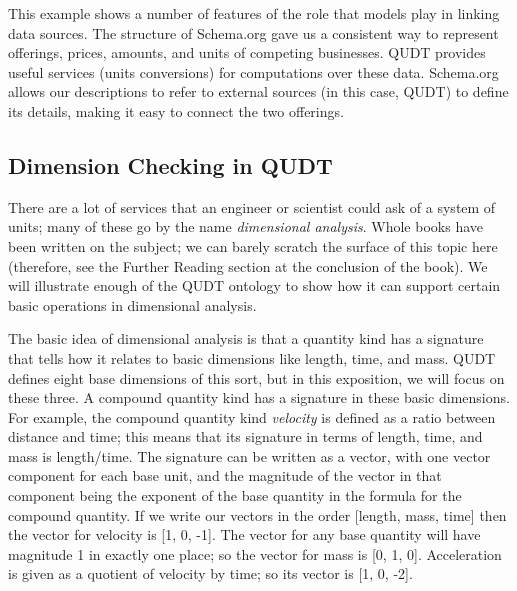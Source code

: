 This example shows a number of features of the role that models play in
linking data sources. The structure of Schema.org gave
us a consistent way to represent offerings, prices, amounts, and units
of competing businesses. QUDT provides useful services (units
conversions) for computations over these data. Schema.org allows our 
descriptions to refer to external sources (in this case, QUDT) to define
its details, making it easy to connect the two offerings. 

\subsection{Dimension Checking in QUDT}

There are a lot of services that an engineer or scientist could ask of a
system of units; many of these go by the name \emph{dimensional analysis}.
Whole books have been written on the subject; we can barely scratch the
surface of this topic here (therefore, see the Further Reading section
at the conclusion of the book). We will illustrate enough of the QUDT
ontology to show how it can support certain basic operations in
dimensional analysis.

The basic idea of dimensional analysis is that a quantity kind has a
signature that tells how it relates to
basic dimensions like length, time, and mass. QUDT defines eight base
dimensions of this sort, but in this exposition, we will focus on these
three. A compound quantity kind has a signature in these basic dimensions.
For example, the compound quantity kind \emph{velocity} is defined as a ratio
between distance and time; this means that its signature in terms of
length, time, and mass is length/time. The signature can be written as a
vector, with one vector component for each base unit, and the magnitude
of the vector in that component being the exponent of the base quantity
in the formula for the compound quantity. If we write our vectors in the
order {[}length, mass, time{]} then the vector for velocity is {[}1, 0,
-1{]}. The vector for any base quantity will have magnitude 1 in exactly
one place; so the vector for mass is {[}0, 1, 0{]}. Acceleration is
given as a quotient of velocity by time; so its vector is {[}1, 0,
-2{]}.


